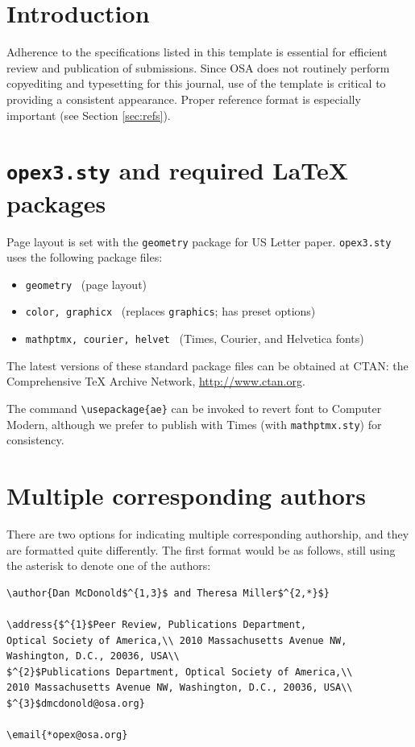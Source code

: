 \documentclass[10pt,letterpaper]{article}
\begin{document}
\section{Introduction}
Adherence to the specifications listed in this template is essential for efficient review and publication of submissions. Since OSA does not routinely perform copyediting and typesetting for this journal, use of the template is critical to providing a consistent appearance. Proper reference format is especially important (see Section \ref{sec:refs}).

\section{\texttt{opex3.sty} and required \LaTeX{} packages}
Page layout is set with the \texttt{geometry} package for US Letter paper. \texttt{opex3.sty} uses the following package files:

\begin{itemize}
\item \texttt{geometry} \ (page layout)
\item \texttt{color, graphicx} \ (replaces \texttt{graphics}; has preset options)
\item \texttt{mathptmx, courier, helvet} \ (Times, Courier, and Helvetica fonts)
\end{itemize}

The latest versions of these standard package files can be obtained at CTAN: the Comprehensive TeX Archive Network, \url{http://www.ctan.org}.

The command \verb+\usepackage{ae}+ can be invoked to revert font to Computer Modern, although we prefer to publish with Times (with \texttt{mathptmx.sty}) for consistency.

\section{Multiple corresponding authors}

There are two options for indicating multiple corresponding authorship, and they are formatted quite differently. The first format would be as follows, still using the asterisk to denote one of the authors:

\begin{verbatim}
\author{Dan McDonold$^{1,3}$ and Theresa Miller$^{2,*}$}

\address{$^{1}$Peer Review, Publications Department,
Optical Society of America,\\ 2010 Massachusetts Avenue NW,
Washington, D.C., 20036, USA\\
$^{2}$Publications Department, Optical Society of America,\\
2010 Massachusetts Avenue NW, Washington, D.C., 20036, USA\\
$^{3}$dmcdonold@osa.org}

\email{*opex@osa.org}
\end{verbatim}
\end{document}

